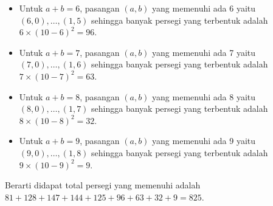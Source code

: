 \begin{solusi}
\begin{itemize}
 \item Untuk $a+b=6$, pasangan $(a,b)$ yang memenuhi ada 6 yaitu $(6,0),\dots,(1,5)$ sehingga banyak persegi yang terbentuk adalah $6 \times (10-6)^2 = 96$.
 \item Untuk $a+b=7$, pasangan $(a,b)$ yang memenuhi ada 7 yaitu $(7,0),\dots,(1,6)$ sehingga banyak persegi yang terbentuk adalah $7 \times (10-7)^2 = 63$.
 \item Untuk $a+b=8$, pasangan $(a,b)$ yang memenuhi ada 8 yaitu $(8,0),\dots,(1,7)$ sehingga banyak persegi yang terbentuk adalah $8 \times (10-8)^2 = 32$.
 \item Untuk $a+b=9$, pasangan $(a,b)$ yang memenuhi ada 9 yaitu $(9,0),\dots,(1,8)$ sehingga banyak persegi yang terbentuk adalah $9 \times (10-9)^2 = 9$.
 \end{itemize}
 Berarti didapat total persegi yang memenuhi adalah $81+128+147+144+125+96+63+32+9=\boxed{825}$.
\end{solusi}


